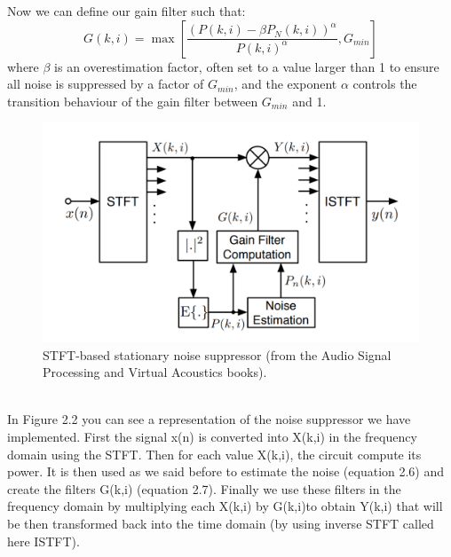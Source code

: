 \documentclass[11pt,a4paper,titlepage]{report}
\begin{document}
Now we can define our gain filter such that:
\begin{equation}
G(k,i) = \max[\frac{(P(k,i)- \beta P_{N}(k,i))^\alpha}{P(k,i)^\alpha}, G_{min}]
\end{equation}
where $\beta$ is an overestimation factor, often set to a value larger than 1 to ensure all noise is suppressed by a factor of $G_{min}$, and the exponent $\alpha$ controls the transition behaviour of the gain filter between $G_{min}$ and 1.
\begin{figure}[h!]
	\centering
	\includegraphics[width=0.7\linewidth]{rapport4}
	\caption{STFT-based stationary noise suppressor (from the Audio Signal Processing and Virtual Acoustics books\cite{SCNR}).}
	\label{fig:rapport4}
\end{figure}\\
\hspace*{0.6cm}
In Figure 2.2 you can see a representation of the noise suppressor we have implemented. First the signal x(n) is converted into X(k,i) in the frequency domain using the STFT. Then for each value X(k,i), the circuit compute its power. It is then used as we said before to estimate the noise (equation 2.6) and create the filters G(k,i) (equation 2.7). Finally we use these filters in the frequency domain by multiplying each X(k,i) by G(k,i)to obtain Y(k,i) that will be then transformed back into the time domain (by using inverse STFT called here ISTFT).
\end{document}
